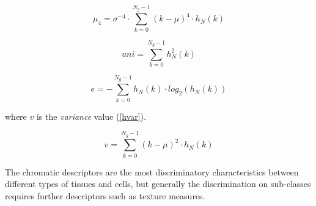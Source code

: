 \documentclass[final,a4paper,12pt,english]{UnicaPhdThesis3}
\begin{document}
\begin{equation}\label{hkurt}
\mu_4 =\sigma^{-4} \cdot \sum_{k=0}^{N_{g}-1} (k - \mu)^4 \cdot h_N(k)
\end{equation}

\begin{equation}\label{huni}
uni=\sum_{k=0}^{N_{g}-1} h_N ^2 (k)
\end{equation}

\begin{equation}\label{hent}
e=-\sum_{k=0}^{N_{g}-1}  h_N(k) \cdot  log_2(h_N(k))
\end{equation}

where $v$ is the \textit{variance} value (\ref{hvar}). 

\begin{equation}\label{hvar}
v=\sum_{k=0}^{N_{g}-1} (k - \mu)^2 \cdot h_N(k)
\end{equation}

The chromatic descriptors are the most discriminatory characteristics between different types of tissues and cells, but generally the discrimination on sub-classes requires further descriptors such as texture measures.
\end{document}
